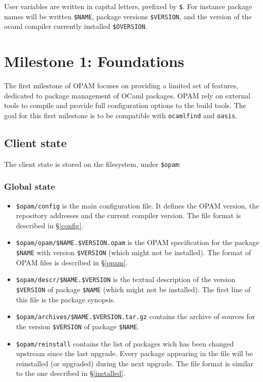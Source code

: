 \documentclass[a4paper,11pt]{article}
\begin{document}
User variables are written in capital letters, prefixed by \verb+$+. For
instance package names will be written \verb+$NAME+, package versions
\verb+$VERSION+, and the version of the ocaml compiler currently
installed \verb+$OVERSION+.

\section{Milestone 1: Foundations}

The first milestone of OPAM focuses on providing a limited set of
features, dedicated to package management of OCaml packages. OPAM rely
on external tools to compile and provide full configuration options to
the build tools. The goal for this first milestone is to be compatible
with {\tt ocamlfind} and {\tt oasis}.

\subsection{Client state}
\label{client}

The client state is stored on the filesystem, under {\tt \$opam}:

\subsubsection{Global state}

\begin{itemize}

\item {\tt \$opam/config} is the main configuration file. It defines
  the OPAM version, the repository addresses and the current compiler
  version. The file format is described in \S\ref{config}.

\item \verb+$opam/opam/$NAME.$VERSION.opam+ is the OPAM specification
  for the package \verb+$NAME+ with version \verb+$VERSION+ (which
  might not be installed). The format of OPAM files is described in
  \S\ref{opam}.

\item \verb+$opam/descr/$NAME.$VERSION+ is the textual description of
  the version \verb+$VERSION+ of package \verb+$NAME+ (which might not
  be installed). The first line of this file is the package synopsis.

\item \verb+$opam/archives/$NAME.$VERSION.tar.gz+ contains the archive
  of sources for the version \verb+$VERSION+ of package \verb+$NAME+.

\item \verb+$opam/reinstall+ contains the list of packages wich has been
  changed upstream since the last upgrade. Every package appearing in
  the file will be reinstalled (or upgraded) during the next
  upgrade. The file format is similar to the one described in
  \S\ref{installed}.

\end{itemize}
\end{document}
